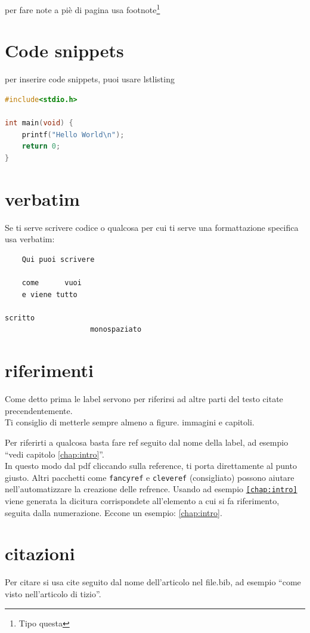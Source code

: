 \documentclass[12pt,a4paper,twoside]{book}
\begin{document}
per fare note a piè di pagina usa footnote\footnote{Tipo questa}

\section{Code snippets}
per inserire code snippets, puoi usare lstlisting

\begin{lstlisting}[language=c]
#include<stdio.h>

int main(void) {
    printf("Hello World\n");
    return 0;
}
\end{lstlisting}

\section{verbatim}
Se ti serve scrivere codice o qualcosa per cui ti serve una formattazione specifica usa verbatim:
\begin{verbatim}
    Qui puoi scrivere

    come      vuoi
    e viene tutto

scritto
                    monospaziato
\end{verbatim}
\section{riferimenti}
Come detto prima le label servono per riferirsi ad altre parti del testo citate precendentemente.\\
Ti consiglio di metterle sempre almeno a figure. immagini e capitoli.

Per riferirti a qualcosa basta fare ref seguito dal nome della label, ad esempio ``vedi capitolo \ref{chap:intro}''.\\In questo modo dal pdf cliccando sulla reference, ti porta direttamente al punto giusto.
Altri pacchetti come \texttt{fancyref} e \texttt{cleveref} (consigliato) possono aiutare nell'automatizzare la creazione delle refrence. Usando ad esempio \texttt{\cref{chap:intro}} viene generata la dicitura corrispondete all'elemento a cui si fa riferimento, seguita dalla numerazione. Eccone un esempio: \cref{chap:intro}.
\section{citazioni}
Per citare si usa cite seguito dal nome dell'articolo nel file.bib, ad esempio ``come visto nell'articolo di tizio\cite{greenwade93}''.
\end{document}
